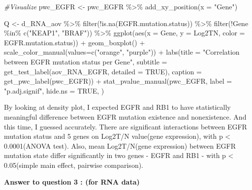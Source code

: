 \documentclass[
]{article}
\newenvironment{Shaded}{\begin{snugshade}}{\end{snugshade}}
\newcommand{\AttributeTok}[1]{\textcolor[rgb]{0.77,0.63,0.00}{#1}}
\newcommand{\CommentTok}[1]{\textcolor[rgb]{0.56,0.35,0.01}{\textit{#1}}}
\newcommand{\ConstantTok}[1]{\textcolor[rgb]{0.00,0.00,0.00}{#1}}
\newcommand{\FunctionTok}[1]{\textcolor[rgb]{0.00,0.00,0.00}{#1}}
\newcommand{\NormalTok}[1]{#1}
\newcommand{\OtherTok}[1]{\textcolor[rgb]{0.56,0.35,0.01}{#1}}
\newcommand{\SpecialCharTok}[1]{\textcolor[rgb]{0.00,0.00,0.00}{#1}}
\newcommand{\StringTok}[1]{\textcolor[rgb]{0.31,0.60,0.02}{#1}}
\begin{document}
\begin{Shaded}
\begin{Highlighting}[]
\CommentTok{\#Visualize}
\NormalTok{pwc\_EGFR }\OtherTok{\textless{}{-}}\NormalTok{ pwc\_EGFR }\SpecialCharTok{\%\textgreater{}\%} \FunctionTok{add\_xy\_position}\NormalTok{(}\AttributeTok{x =} \StringTok{"Gene"}\NormalTok{)}

\NormalTok{Q }\OtherTok{\textless{}{-}}\NormalTok{ d\_RNA\_aov }\SpecialCharTok{\%\textgreater{}\%}
  \FunctionTok{filter}\NormalTok{(}\SpecialCharTok{!}\FunctionTok{is.na}\NormalTok{(EGFR.mutation.status)) }\SpecialCharTok{\%\textgreater{}\%}
  \FunctionTok{filter}\NormalTok{(}\SpecialCharTok{!}\NormalTok{Gene }\SpecialCharTok{\%in\%} \FunctionTok{c}\NormalTok{(}\StringTok{"KEAP1"}\NormalTok{, }\StringTok{"BRAF"}\NormalTok{)) }\SpecialCharTok{\%\textgreater{}\%}
  \FunctionTok{ggplot}\NormalTok{(}\FunctionTok{aes}\NormalTok{(}\AttributeTok{x =}\NormalTok{ Gene, }\AttributeTok{y =}\NormalTok{ Log2TN, }\AttributeTok{color =}\NormalTok{ EGFR.mutation.status)) }\SpecialCharTok{+}
  \FunctionTok{geom\_boxplot}\NormalTok{() }\SpecialCharTok{+}
  \FunctionTok{scale\_color\_manual}\NormalTok{(}\AttributeTok{values=}\FunctionTok{c}\NormalTok{(}\StringTok{"orange"}\NormalTok{, }\StringTok{"purple"}\NormalTok{)) }\SpecialCharTok{+}
  \FunctionTok{labs}\NormalTok{(}\AttributeTok{title =} \StringTok{"Correlation between EGFR mutation status per Gene"}\NormalTok{,}
    \AttributeTok{subtitle =} \FunctionTok{get\_test\_label}\NormalTok{(aov\_RNA\_EGFR, }\AttributeTok{detailed =} \ConstantTok{TRUE}\NormalTok{),}
    \AttributeTok{caption =} \FunctionTok{get\_pwc\_label}\NormalTok{(pwc\_EGFR)) }\SpecialCharTok{+}
  \FunctionTok{stat\_pvalue\_manual}\NormalTok{(pwc\_EGFR, }\AttributeTok{label =} \StringTok{"p.adj.signif"}\NormalTok{, }\AttributeTok{hide.ns =} \ConstantTok{TRUE}\NormalTok{, )}
\end{Highlighting}
\end{Shaded}

By looking at density plot, I expected EGFR and RB1 to have
statistically meaningful difference between EGFR mutation existence and
nonexistence. And this time, I guessed accurately. There are significant
interactions between EGFR mutation status and 5 genes on Log2T/N
value(gene expression), with p \textless{} 0.0001(ANOVA test). Also,
mean Log2T/N(gene expression) between EGFR mutation state differ
significantly in two genes - EGFR and RB1 - with p \textless{}
0.05(simple main effect, pairwise comparison).

\textbf{Answer to question 3 : (for RNA data)}
\end{document}
